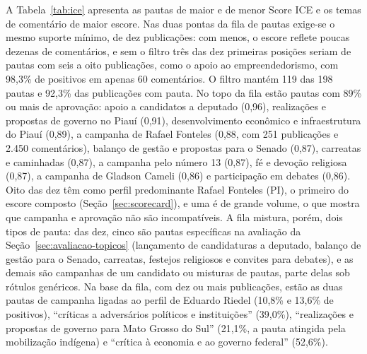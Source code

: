A Tabela~\ref{tab:ice} apresenta as pautas de maior e de menor Score ICE e os temas de comentário de maior escore. Nas duas pontas da fila de pautas exige-se o mesmo suporte mínimo, de dez publicações: com menos, o escore reflete poucas dezenas de comentários, e sem o filtro três das dez primeiras posições seriam de pautas com seis a oito publicações, como o apoio ao empreendedorismo, com 98,3\% de positivos em apenas 60 comentários. O filtro mantém 119 das 198 pautas e 92,3\% das publicações com pauta. No topo da fila estão pautas com 89\% ou mais de aprovação: apoio a candidatos a deputado (0,96), realizações e propostas de governo no Piauí (0,91), desenvolvimento econômico e infraestrutura do Piauí (0,89), a campanha de Rafael Fonteles (0,88, com 251 publicações e 2.450 comentários), balanço de gestão e propostas para o Senado (0,87), carreatas e caminhadas (0,87), a campanha pelo número 13 (0,87), fé e devoção religiosa (0,87), a campanha de Gladson Cameli (0,86) e participação em debates (0,86). Oito das dez têm como perfil predominante Rafael Fonteles (PI), o primeiro do escore composto (Seção~\ref{sec:scorecard}), e uma é de grande volume, o que mostra que campanha e aprovação não são incompatíveis. A fila mistura, porém, dois tipos de pauta: das dez, cinco são pautas específicas na avaliação da Seção~\ref{sec:avaliacao-topicos} (lançamento de candidaturas a deputado, balanço de gestão para o Senado, carreatas, festejos religiosos e convites para debates), e as demais são campanhas de um candidato ou misturas de pautas, parte delas sob rótulos genéricos. Na base da fila, com dez ou mais publicações, estão as duas pautas de campanha ligadas ao perfil de Eduardo Riedel (10,8\% e 13,6\% de positivos), ``críticas a adversários políticos e instituições'' (39,0\%), ``realizações e propostas de governo para Mato Grosso do Sul'' (21,1\%, a pauta atingida pela mobilização indígena) e ``crítica à economia e ao governo federal'' (52,6\%).

